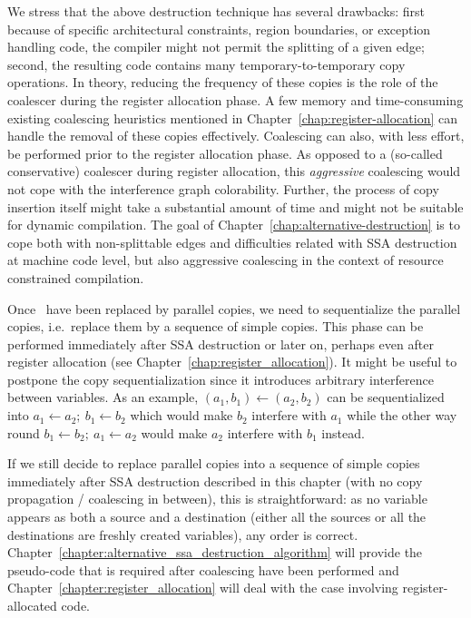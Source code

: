We stress that the above destruction technique has several drawbacks: first because of specific architectural constraints, region boundaries, or exception handling code, the compiler might not permit the splitting of a given edge; second, the resulting code contains many temporary-to-temporary copy operations. In theory, reducing the frequency of these copies is the role of the coalescer during the register allocation phase. A few memory and time-consuming existing coalescing heuristics mentioned in Chapter~\ref{chap:register-allocation} can handle the removal of these copies effectively. Coalescing can also, with less effort, be performed prior to the register allocation phase. As opposed to a (so-called conservative) coalescer during register allocation, this \emph{aggressive} coalescing would not cope with the interference graph colorability. Further, the process of copy insertion itself might take a substantial amount of time and might not be suitable for dynamic compilation. The goal of Chapter~\ref{chap:alternative-destruction} is to cope both with non-splittable edges and difficulties related with SSA destruction at machine code level, but also aggressive coalescing in the context of resource constrained compilation.

Once \phiops\ have been replaced by parallel copies, we need to sequentialize the parallel copies, i.e.\ replace them by a sequence of simple copies. This phase can be performed immediately after SSA destruction or later on, perhaps even after register allocation (see Chapter~\ref{chap:register_allocation}). It might be useful to postpone the copy sequentialization since it introduces arbitrary interference between variables. As an example, $(a_1,b_1)\gets (a_2,b_2)$ can be sequentialized into $a_1\gets a_2;\ b_1\gets b_2$ which would make $b_2$ interfere with $a_1$ while the other way round $b_1\gets b_2;\ a_1\gets a_2$ would make $a_2$ interfere with $b_1$ instead.

If we still decide to replace parallel copies into a sequence of simple copies immediately after SSA destruction described in this chapter (with no copy propagation / coalescing in between), this is straightforward: as no variable appears as both a source and a destination (either all the sources or all the destinations are freshly created variables), any order is correct. Chapter~\ref{chapter:alternative_ssa_destruction_algorithm} will provide the pseudo-code that is required after coalescing have been performed and Chapter~\ref{chapter:register_allocation} will deal with the case involving register-allocated code.

